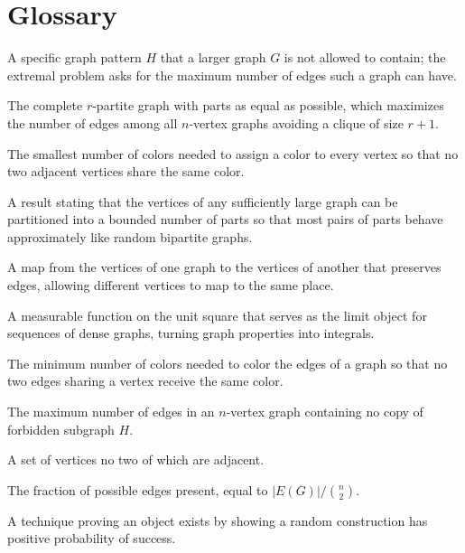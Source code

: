 \section*{Glossary}
\begin{description}[leftmargin=*,style=nextline,itemsep=0.3em]
\item[\textbf{Forbidden subgraph.}] A specific graph pattern $H$ that a larger graph $G$ is not allowed to contain; the extremal problem asks for the maximum number of edges such a graph can have.
\item[\textbf{Turán graph.}] The complete $r$-partite graph with parts as equal as possible, which maximizes the number of edges among all $n$-vertex graphs avoiding a clique of size $r+1$.
\item[\textbf{Chromatic number.}] The smallest number of colors needed to assign a color to every vertex so that no two adjacent vertices share the same color.
\item[\textbf{Regularity lemma.}] A result stating that the vertices of any sufficiently large graph can be partitioned into a bounded number of parts so that most pairs of parts behave approximately like random bipartite graphs.
\item[\textbf{Graph homomorphism.}] A map from the vertices of one graph to the vertices of another that preserves edges, allowing different vertices to map to the same place.
\item[\textbf{Graphon.}] A measurable function on the unit square that serves as the limit object for sequences of dense graphs, turning graph properties into integrals.
\item[\textbf{Chromatic index.}] The minimum number of colors needed to color the edges of a graph so that no two edges sharing a vertex receive the same color.
\item[\textbf{Extremal number ex(n,H).}] The maximum number of edges in an $n$-vertex graph containing no copy of forbidden subgraph $H$.
\item[\textbf{Independent set.}] A set of vertices no two of which are adjacent.
\item[\textbf{Edge density.}] The fraction of possible edges present, equal to $|E(G)|/\binom{n}{2}$.
\item[\textbf{Probabilistic method.}] A technique proving an object exists by showing a random construction has positive probability of success.
\end{description}

